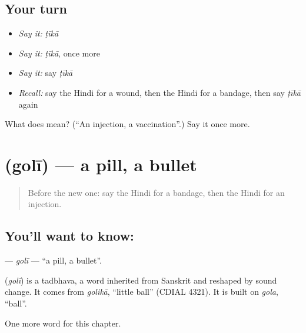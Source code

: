 \subsection*{Your turn}
\begin{itemize}
\raggedright
  \item \emph{Say it:} \emph{ṭīkā}
  \item \emph{Say it:} \emph{ṭīkā}, once more
  \item \emph{Say it:} say \emph{ṭīkā}
  \item \emph{Recall:} say the Hindi for a wound, then the Hindi for a bandage, then say \emph{ṭīkā} again
\end{itemize}

\begin{tcolorbox}[breakable,colback=teal!4,colframe=teal!35!black,title={Before you move on}]
What does  mean? (\textquotedblleft{}An injection, a vaccination\textquotedblright{}.) Say it once more.
\end{tcolorbox}
\section[\texorpdfstring{\hi{गोली} (golī)}{गोली (golī)}]{ (golī) — a pill, a bullet}

\label{lesson:HI-C256-goli}



\begin{quote}
Before the new one: say the Hindi for a bandage, then the Hindi for an injection.
\end{quote}

\subsection*{You'll want to know: }
\textbf{} — \emph{golī} — \textquotedblleft{}a pill, a bullet\textquotedblright{}.

\begin{cousinweb}
\textbf{} (\emph{golī}) is a tadbhava, a word inherited from Sanskrit and reshaped by sound change. It comes from \emph{golikā}, \textquotedblleft{}little ball\textquotedblright{} (CDIAL 4321). It is built on \emph{gola}, \textquotedblleft{}ball\textquotedblright{}.
\end{cousinweb}

\begin{grammarlens}[title={What you've built}]
One more word for this chapter.
\end{grammarlens}

